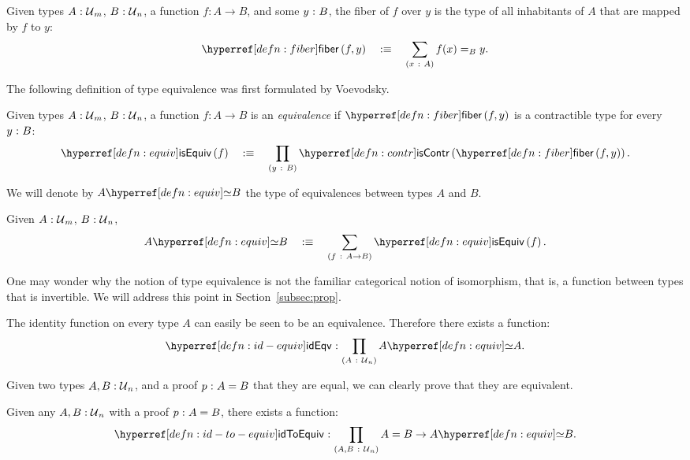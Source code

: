 \begin{defn}[Fiber]\label{defn:fiber}
  Given types $A\hspace{0.1mm}:\hspace{0.1mm}\mathcal{U}{}_m$, $B\hspace{0.1mm}:\hspace{0.1mm}\mathcal{U}{}_n$, a function $f : A
  \rightarrow B$, and some $y\hspace{0.1mm}:\hspace{0.1mm}B$, the fiber of $f$ over $y$ is the type of all
  inhabitants of $A$ that are mapped by $f$ to $y$:
  \begin{equation*}
    \fiber{f}{y} \quad\is\quad \sigmaty{x}{A}{f(x) =_B y}.
  \end{equation*}
\end{defn}

The following definition of type equivalence was first formulated by Voevodsky.
\begin{defn}[Equivalence]\label{defn:equiv}
  Given types $A\hspace{0.1mm}:\hspace{0.1mm}\mathcal{U}{}_m$, $B\hspace{0.1mm}:\hspace{0.1mm}\mathcal{U}{}_n$, a function $f : A \rightarrow B$ is an
  \emph{equivalence} if $\fiber{f}{y}$ is a contractible type for every $y\hspace{0.1mm}:\hspace{0.1mm}B$:
  \begin{equation*}
    \isequiv{f} \quad\is\quad \pity{y}{B}{\iscontr{\fiber{f}{y}}}.
  \end{equation*}
\end{defn}

We will denote by $\typequiv{A}{B}$ the type of equivalences between types $A$ and $B$.
\begin{defn}
  Given $A\hspace{0.1mm}:\hspace{0.1mm}\mathcal{U}{}_m$, $B\hspace{0.1mm}:\hspace{0.1mm}\mathcal{U}{}_n$,
  \begin{equation*}
    \typequiv{A}{B} \quad\is\quad \sigmaty{f}{A \rightarrow B}{\isequiv{f}}.
  \end{equation*}
\end{defn}

One may wonder why the notion of type equivalence is not the familiar categorical notion
of isomorphism, that is, a function between types that is invertible. We will address this
point in Section~\ref{subsec:prop}.

\begin{defn}\label{defn:id-equiv}
  The identity function on every type $A$ can easily be seen to be an equivalence.
  Therefore there exists a function:
  \begin{equation*}
    \oftyI{\idequivnm}{\pity{A}{\univ{}_n}{\typequiv{A}{A}}}.
  \end{equation*}
\end{defn}

Given two types $A, B:\mathcal{U}{}_n$, and a proof $p\hspace{0.1mm}:\hspace{0.1mm}A = B$ that they are
equal, we can clearly prove that they are equivalent.
\begin{defn}\label{defn:id-to-equiv}
  Given any $A, B:\mathcal{U}{}_n$ with a proof $p\hspace{0.1mm}:\hspace{0.1mm}A = B$, there exists a
  function:
  \begin{equation*}
    \oftyI{\idtoeqvnm{}}{\pity{A, B}{\univ{}_n}{A = B \rightarrow \typequiv{A}{B}}}.
  \end{equation*}
\end{defn}

